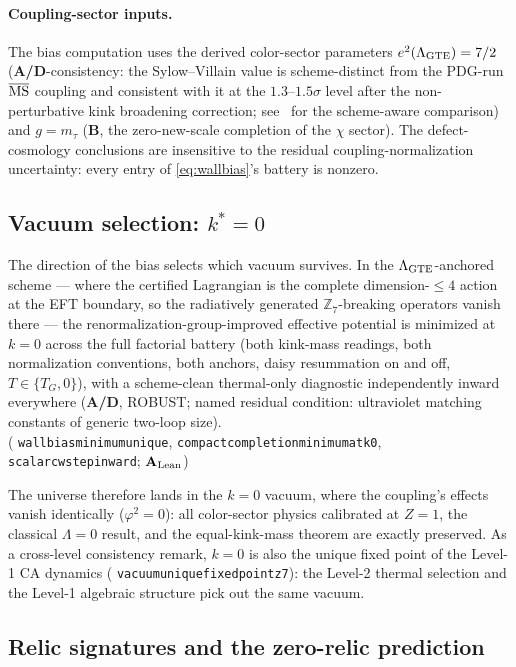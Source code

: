 \documentclass[11pt]{article}
\theoremstyle{remark}
\newcommand{\ZS}{\mathbb{Z}_7}
\newcommand{\lean}[1]{%
  \penalty-100
  \begingroup\def\_{\textunderscore\allowbreak}\texttt{#1}\endgroup}
\newcommand{\CatAL}{\ensuremath{\textbf{A}_{\rm Lean}}}
\newcommand{\CatAD}{\textbf{A/D}}
\newcommand{\CatB}{\textbf{B}}
\begin{document}
\paragraph{Coupling-sector inputs.}
The bias computation uses the derived color-sector parameters
$e^2(\Lambda_{\rm GTE}) = 7/2$ (\CatAD-consistency: the Sylow--Villain value is
scheme-distinct from the PDG-run $\overline{\rm MS}$ coupling and consistent
with it at the $1.3$--$1.5\sigma$ level after the non-perturbative kink
broadening correction; see~\cite{SpivackPhiMDLField} for the scheme-aware
comparison) and $g = m_\tau$ (\CatB, the zero-new-scale completion of the
$\chi$ sector). The defect-cosmology conclusions are insensitive to the
residual coupling-normalization uncertainty: every entry of \eqref{eq:wallbias}'s
battery is nonzero.

\subsection{Vacuum selection: $k^* = 0$}
\label{sec:defect-vacuum}

The direction of the bias selects which vacuum survives. In the
$\Lambda_{\rm GTE}$-anchored scheme --- where the certified Lagrangian is the
complete dimension-$\le4$ action at the EFT boundary, so the radiatively
generated $\ZS$-breaking operators vanish there --- the
renormalization-group-improved effective potential is minimized at $k = 0$
across the full factorial battery (both kink-mass readings, both normalization
conventions, both anchors, daisy resummation on and off, $T \in \{T_G, 0\}$),
with a scheme-clean thermal-only diagnostic independently inward everywhere
(\CatAD, ROBUST; named residual condition: ultraviolet matching constants of
generic two-loop size).\\
(\lean{wall\_bias\_minimum\_unique},
\lean{compact\_completion\_minimum\_at\_k0},
\lean{scalar\_cw\_step\_inward}; \CatAL)

The universe therefore lands in the $k = 0$ vacuum, where the coupling's
effects vanish identically ($\varphi^2 = 0$): all color-sector physics
calibrated at $Z = 1$, the classical $\Lambda = 0$ result, and the
equal-kink-mass theorem are exactly preserved. As a cross-level consistency
remark, $k = 0$ is also the unique fixed point of the Level-1 CA dynamics
(\lean{vacuum\_unique\_fixed\_point\_z7}): the Level-2 thermal selection and
the Level-1 algebraic structure pick out the same vacuum.

\subsection{Relic signatures and the zero-relic prediction}
\label{sec:defect-relics}
\end{document}
